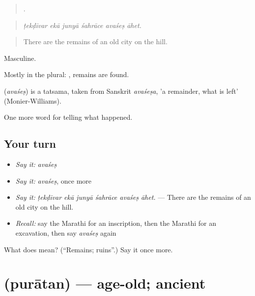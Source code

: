 \begin{quote}
     .
\end{quote}

\begin{quote}
\emph{ṭekḍīvar ekā junyā śahrāce avaśeṣ āhet.}
\end{quote}

\begin{quote}
There are the remains of an old city on the hill.
\end{quote}

Masculine.

Mostly in the plural:  , remains are found.

\begin{cousinweb}
\textbf{} (\emph{avaśeṣ}) is a tatsama, taken from Sanskrit \emph{avaśeṣa}, 'a remainder, what is left' (Monier-Williams).
\end{cousinweb}

\begin{grammarlens}[title={What you've built}]
One more word for telling what happened.
\end{grammarlens}

\subsection*{Your turn}
\begin{itemize}
\raggedright
  \item \emph{Say it:} \emph{avaśeṣ}
  \item \emph{Say it:} \emph{avaśeṣ}, once more
  \item \emph{Say it:} \emph{ṭekḍīvar ekā junyā śahrāce avaśeṣ āhet.} — There are the remains of an old city on the hill.
  \item \emph{Recall:} say the Marathi for an inscription, then the Marathi for an excavation, then say \emph{avaśeṣ} again
\end{itemize}

\begin{tcolorbox}[breakable,colback=teal!4,colframe=teal!35!black,title={Before you move on}]
What does  mean? (\textquotedblleft{}Remains; ruins\textquotedblright{}.) Say it once more.
\end{tcolorbox}
\section[\texorpdfstring{\mr{पुरातन} (purātan)}{पुरातन (purātan)}]{ (purātan) — age-old; ancient}

